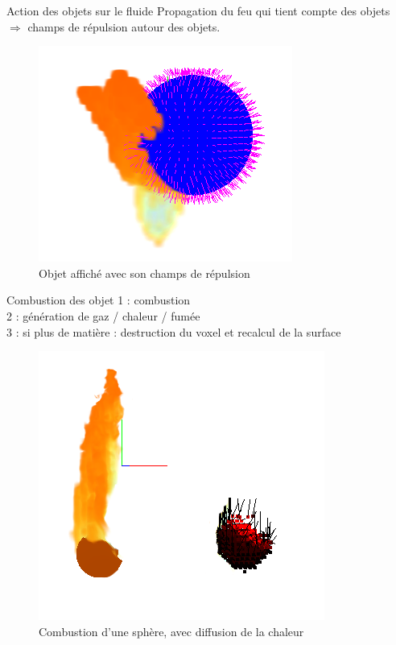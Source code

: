 \documentclass{beamer}
\begin{document}
\begin{frame}{Action des objets sur le fluide}
  Propagation du feu qui tient compte des objets\\
  $\Rightarrow$ champs de répulsion autour des objets.
  \begin{figure}[!h]
    \centering\includegraphics[scale=0.4]{Contour.png}
    \caption{Objet affiché avec son champs de répulsion}
    \label{repulsion}
  \end{figure}
\end{frame}


\begin{frame}{Combustion des objet}
    1 : combustion\\
    2 : génération de gaz / chaleur / fumée\\
    3 : si plus de matière : destruction du voxel et recalcul de la surface\\
  
  \begin{figure}[!h]
    \centering\includegraphics[scale=0.3]{Decomposition.png}
    \caption{Combustion d'une sphère, avec diffusion de la chaleur}
    \label{BoisQuiBrule}
  \end{figure}
\end{frame}
\end{document}
